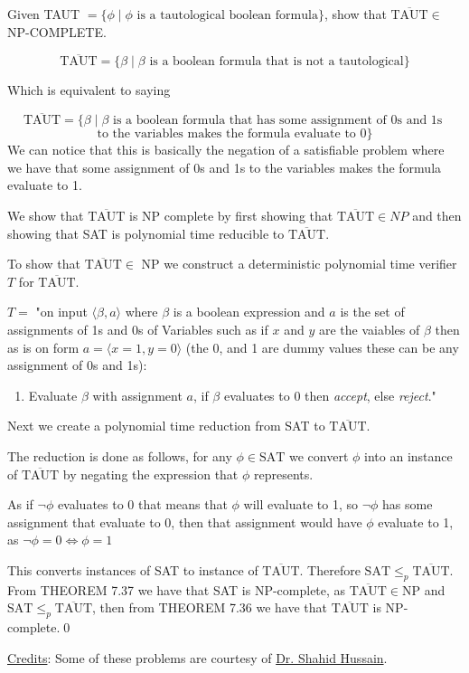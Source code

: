 \documentclass[addpoints]{exam}
\begin{document}
\begin{questions}
    \newpage
    
    \question[10] Given TAUT $ = \{\phi \mid\phi\text{ is a tautological boolean formula} \}$, show that $\overline{\text{TAUT}}\in$ NP-COMPLETE.
    \begin{solution}

        \[\overline{\text{TAUT}} = \{\beta \mid\beta\text{ is a boolean formula that is not a tautological}\}\]
        
        Which is equivalent to saying
        
        \[\overline{\text{TAUT}} = \{\beta \mid \beta\text{ is a boolean formula that has some assignment of 0s and 1s }\]
        \[\text{to the variables makes the formula evaluate to 0}\}\]
        We can notice that this is basically the negation of a satisfiable problem where we have that some assignment of 0s and 1s to the variables makes the formula evaluate to 1.
        
        We show that $\overline{\text{TAUT}}$ is NP complete by first showing that $\overline{\text{TAUT}}\in NP$ and then showing that SAT is polynomial time reducible to $\overline{\text{TAUT}}$.
        
        To show that $\overline{\text{TAUT}}\in$ NP we construct a deterministic polynomial time verifier $T$ for $\overline{\text{TAUT}}$.
        
        $T = $ "on input $\langle\beta, a\rangle$ where $\beta$ is a boolean expression and $a$ is the set of assignments of 1s and 0s of Variables such as if $x$ and $y$ are the vaiables of $\beta$ then as is on form $a = \langle x = 1, y = 0\rangle$ (the 0, and 1 are dummy values these can be any assignment of 0s and 1s):
        \begin{enumerate}
            \item Evaluate $\beta$ with assignment $a$, if $\beta$ evaluates to 0 then \textit{accept}, else \textit{reject}."
        \end{enumerate}
        Next we create a polynomial time reduction from SAT to $\overline{\text{TAUT}}$.
        
        The reduction is done as follows, for any $\phi\in\text{SAT}$ we convert $\phi$ into an instance of $\overline{\text{TAUT}}$ by negating the expression that $\phi$ represents.
        
        As if $\neg\phi$ evaluates to 0 that means that $\phi$ will evaluate to 1, so $\neg\phi$ has some assignment that evaluate to 0, then that assignment would have $\phi$ evaluate to 1, as $\neg\phi = 0\iff\phi = 1$
        
        This converts instances of SAT to instance of $\overline{\text{TAUT}}$. Therefore $\text{SAT} \leq_p \overline{\text{TAUT}}$. From THEOREM 7.37 we have that SAT is NP-complete, as $\overline{\text{TAUT}}\in\text{NP}$ and $\text{SAT} \leq_p \overline{\text{TAUT}}$, then from THEOREM 7.36 we have that $\overline{\text{TAUT}}$ is NP-complete.\hfill\qed
    \end{solution}
\end{questions}

\noindent\underline{Credits}: Some of these problems are courtesy of \href{https://www.iba.edu.pk/faculty-profile.php?ftype=&id=shahidhussain}{Dr. Shahid Hussain}.
\end{document}
